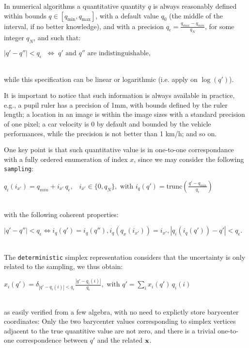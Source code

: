 \documentclass[a4,12pt]{article}
\newcommand{\eqline}[1]{\\\centerline{$#1$}\\}
\begin{document}
In numerical algorithms a quantitative quantity $q$ is always reasonably defined within bounds $q \in [q_{\min}, q_{\max}]$, with a default value $q_0$ (the middle of the interval, if no better knowledge), and with a precision $q_\epsilon = \frac{q_{max} - q_{min}}{q_N}$, for some integer $q_N$, and such that:
\eqline{|q' - q''| < q_\epsilon \;\;\Leftrightarrow\; \mbox{$q'$ and $q''$ are indistinguishable},}
while this specification can be linear or logarithmic (i.e. apply on $\log(q')$).

It is important to notice that such information is always available in practice, e.g., a pupil ruler has a precision of 1mm, with bounds defined by the ruler length; a location in an image is within the image sizes with a standard precision of one pixel; a car velocity is 0 by default and bounded by the vehicle performances, while the precision is not better than 1 km/h; and so on.

One key point is that such quantitative value is in one-to-one correspondance with a fully ordered enumeration of index $x$, since we may consider the following {\tt sampling}:
\eqline{q_i(i_{x'}) = q_{min} + i_{x'} \, q_\epsilon, \;\;\; i_{x'} \in \{0, q_N\}, \mbox{ with } i_q(q') = \mbox{trunc}\left(\frac{q' - q_{min}}{q_\epsilon}\right)}
with the following coherent properties:
\eqline{|q' - q''| < q_\epsilon \Leftrightarrow i_q(q') = i_q(q''), i_q(q_x(i_{x'})) = i_{x'}, |q_i(i_q(q')) - q'| <  q_\epsilon.}

The {\tt deterministic} simplex representation considers that the uncertainty is only related to the sampling, we thus obtain:
\eqline{x_i(q') = \delta_{|q' - q_i(i)| < q_\epsilon} \frac{|q' - q_i(i)|}{q_\epsilon},  \mbox{ with } q' = \sum_i x_i(q') \, q_i(i)}
as easily verified from a few algebra, with no need to explictly store barycenter coordinates: Only the two barycenter values corresponding to simplex vertices adjacent to the true quantitive value are not zero, and there is a trivial one-to-one correspondence between $q'$ and the related ${\bf x}$.
\end{document}
